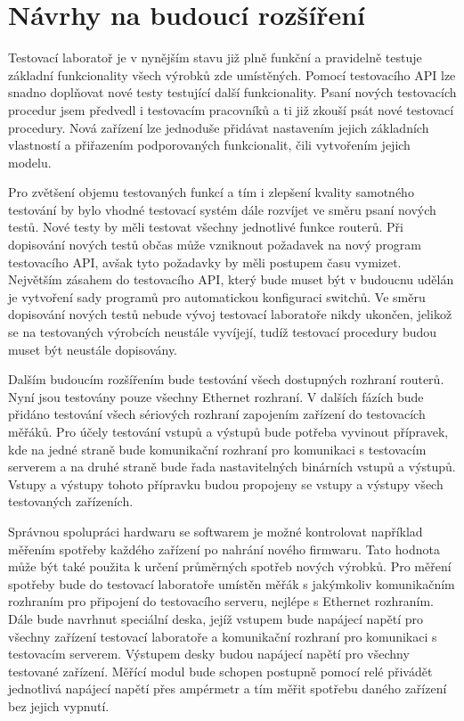 \chapter{Návrhy na budoucí rozšíření}
Testovací laboratoř je v nynějším stavu již plně funkční a pravidelně testuje základní funkcionality všech výrobků zde umístěných. Pomocí testovacího API lze snadno doplňovat nové testy testující další funkcionality. Psaní nových testovacích procedur jsem předvedl i testovacím pracovníků a ti již zkouší psát nové testovací procedury. Nová zařízení lze jednoduše přidávat nastavením jejich základních vlastností a přiřazením podporovaných funkcionalit, čili vytvořením jejich modelu.

Pro zvětšení objemu testovaných funkcí a tím i zlepšení kvality samotného testování by bylo vhodné testovací systém dále rozvíjet ve směru psaní nových testů. Nové testy by měli testovat všechny jednotlivé funkce routerů. Při dopisování nových testů občas může vzniknout požadavek na nový program testovacího API, avšak tyto požadavky by měli postupem času vymizet. Největším zásahem do testovacího API, který bude muset být v budoucnu udělán je vytvoření sady programů pro automatickou konfiguraci switchů. Ve směru dopisování nových testů nebude vývoj testovací laboratoře nikdy ukončen, jelikož se na testovaných výrobcích neustále vyvíjejí, tudíž testovací procedury budou muset být neustále dopisovány.

Dalším budoucím rozšířením bude testování všech dostupných rozhraní routerů. Nyní jsou testovány pouze všechny Ethernet rozhraní. V dalších fázích bude přidáno testování všech sériových rozhraní zapojením zařízení do testovacích měřáků. Pro účely testování vstupů a výstupů bude potřeba vyvinout přípravek, kde na jedné straně bude komunikační rozhraní pro komunikaci s testovacím serverem a na druhé straně bude řada nastavitelných binárních vstupů a výstupů. Vstupy a výstupy tohoto přípravku budou propojeny se vstupy a výstupy všech testovaných zařízeních.

Správnou spolupráci hardwaru se softwarem je možné kontrolovat například měřením spotřeby každého zařízení po nahrání nového firmwaru. Tato hodnota může být také použita k určení průměrných spotřeb nových výrobků. Pro měření spotřeby bude do testovací laboratoře umístěn měřák s jakýmkoliv komunikačním rozhraním pro připojení do testovacího serveru, nejlépe s Ethernet rozhraním. Dále bude navrhnut speciální deska, jejíž vstupem bude napájecí napětí pro všechny zařízení testovací laboratoře a komunikační rozhraní pro komunikaci s testovacím serverem. Výstupem desky budou napájecí napětí pro všechny testované zařízení. Měřící modul bude schopen postupně pomocí relé přivádět jednotlivá napájecí napětí přes ampérmetr a tím měřit spotřebu daného zařízení bez jejich vypnutí.

\endinput
